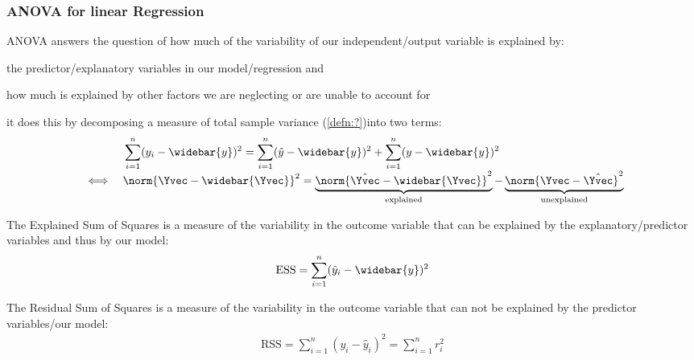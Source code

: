 \subsubsection{ANOVA for linear Regression}
\begin{defnbox}\nospacing
  \begin{defn}
     ANOVA answers the question of how much of the variability of our
     independent/output variable is explained by:
     \begin{itemizenosep}
         \item the predictor/explanatory variables in our model/regression and
         \item how much is explained by other factors we are neglecting or are unable to account for
     \end{itemizenosep}
     it does this by decomposing a measure of total sample variance (\cref{defn:?})into two terms:
     \begin{align}
       &&&\sum_{i=1}^{n}(y_i-\widebar{y})^2=\sum_{i=1}^{n}(\hat{y}-\widebar{y})^2+\sum_{i=1}^{n}(y-\widebar{y})^2\nonumber \\[-1\jot]
       &\iff&&\norm{\Yvec-\widebar{\Yvec}}^2=\underbrace{\norm{\hat{\Yvec}-\widebar{\Yvec}}^2}_{\text{explained}}
               -\underbrace{\norm{\Yvec-\hat{\Yvec}}^2}_{\text{unexplained}}\label{eq:ANOVA}
     \end{align}
  \end{defn}
\end{defnbox}
\begin{defnbox}\nospacing
  \begin{defn}\label{defn:ESS}
    The Explained Sum of Squares is a measure of the
    variability in the outcome variable that can be explained by the explanatory/predictor
    variables and thus by our model:
    \begin{align}
      \text{ESS}=\sum_{i=1}^{n}(\hat{y}_i-\widebar{y})^2
    \end{align}
  \end{defn}
\end{defnbox}
\begin{defnbox}\nospacing
  \begin{defn}\label{defn:RSS}
    The Residual Sum of Squares is a measure
    of the variability in the outcome variable that can not be explained by the
    predictor variables/our model:
    \begin{align}
      \text{RSS}=\sum_{i=1}^{n}(y_i-\hat{y}_i)^2=\sum_{i=1}^{n}r_i^2
    \end{align}
  \end{defn}
\end{defnbox}
